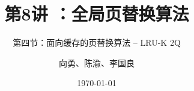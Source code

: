



\title[第8讲]{第8讲 ：全局页替换算法} %
\subtitle{第四节：面向缓存的页替换算法 -- LRU-K 2Q}
\author{向勇、陈渝、李国良} %
\date{\today} %




\begin{frame}
\titlepage %
\end{frame}

%

